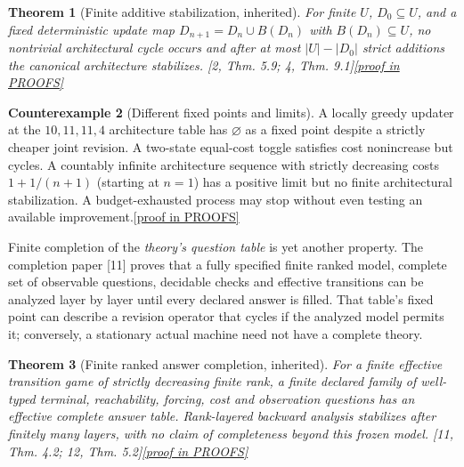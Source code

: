 \documentclass[11pt,letterpaper]{article}
\newtheorem{theorem}{Theorem}[section]
\theoremstyle{definition}
\newtheorem{counterexample}[theorem]{Counterexample}
\theoremstyle{remark}
\newcommand{\prooflink}[1]{\hfill\hyperlink{proof:#1}{\footnotesize[proof in PROOFS]}}
\newcommand{\src}[1]{\textup{[#1]}}
\begin{document}
\begin{theorem}[Finite additive stabilization, inherited]\label{thm:stabilize}\hypertarget{claim:stabilize}{}
For finite $U$, $D_0\subseteq U$, and a fixed deterministic update map $D_{n+1}=D_n\cup B(D_n)$ with $B(D_n)\subseteq U$, no nontrivial architectural cycle occurs and after at most $|U|-|D_0|$ strict additions the canonical architecture stabilizes. \src{2, Thm. 5.9; 4, Thm. 9.1}\prooflink{stabilize}
\end{theorem}

\begin{counterexample}[Different fixed points and limits]\label{cex:fixed}\hypertarget{claim:fixed}{}
A locally greedy updater at the $10,11,11,4$ architecture table has $\varnothing$ as a fixed point despite a strictly cheaper joint revision. A two-state equal-cost toggle satisfies cost nonincrease but cycles. A countably infinite architecture sequence with strictly decreasing costs $1+1/(n+1)$ (starting at $n=1$) has a positive limit but no finite architectural stabilization. A budget-exhausted process may stop without even testing an available improvement.\prooflink{fixed}
\end{counterexample}

Finite completion of the \emph{theory's question table} is yet another property. The completion paper \src{11} proves that a fully specified finite ranked model, complete set of observable questions, decidable checks and effective transitions can be analyzed layer by layer until every declared answer is filled. That table's fixed point can describe a revision operator that cycles if the analyzed model permits it; conversely, a stationary actual machine need not have a complete theory.

\begin{theorem}[Finite ranked answer completion, inherited]\label{thm:completion}\hypertarget{claim:completion}{}
For a finite effective transition game of strictly decreasing finite rank, a finite declared family of well-typed terminal, reachability, forcing, cost and observation questions has an effective complete answer table. Rank-layered backward analysis stabilizes after finitely many layers, with no claim of completeness beyond this frozen model. \src{11, Thm. 4.2; 12, Thm. 5.2}\prooflink{completion}
\end{theorem}
\end{document}
